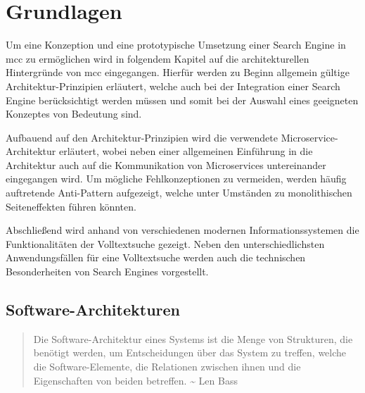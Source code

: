 \chapter{Grundlagen\label{chap2:Zweites-Kapitel}}

Um eine Konzeption und eine prototypische Umsetzung einer Search Engine in \gls{mcc} zu ermöglichen wird in folgendem Kapitel auf die architekturellen Hintergründe von \gls{mcc} eingegangen. Hierfür werden zu Beginn allgemein gültige Architektur-Prinzipien erläutert, welche auch bei der Integration einer Search Engine berücksichtigt werden müssen und somit bei der Auswahl eines geeigneten Konzeptes von Bedeutung sind.

Aufbauend auf den Architektur-Prinzipien wird die verwendete Microservice-Architektur erläutert, wobei neben einer allgemeinen Einführung in die Architektur auch auf die Kommunikation von Microservices untereinander eingegangen wird. Um mögliche Fehlkonzeptionen zu vermeiden, werden häufig auftretende Anti-Pattern aufgezeigt, welche unter Umständen zu monolithischen Seiteneffekten führen könnten.

Abschließend wird anhand von verschiedenen modernen Informationssystemen die Funktionalitäten der Volltextsuche gezeigt. Neben den unterschiedlichsten Anwendungsfällen für eine Volltextsuche werden auch die technischen Besonderheiten von Search Engines vorgestellt.


\section{Software-Architekturen\label{sec2.1:Unterpunkt-1}}

\begin{quote}
    Die Software-Architektur eines Systems ist die Menge von Strukturen, die benötigt werden, um Entscheidungen über das System zu treffen, welche die Software-Elemente, die Relationen zwischen ihnen und die Eigenschaften von beiden betreffen. \textasciitilde{} Len Bass \cite{Bass.2013}
\end{quote}

